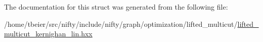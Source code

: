 The documentation for this struct was generated from the following file\+:\begin{DoxyCompactItemize}
\item 
/home/tbeier/src/nifty/include/nifty/graph/optimization/lifted\+\_\+multicut/\hyperlink{lifted__multicut__kernighan__lin_8hxx}{lifted\+\_\+multicut\+\_\+kernighan\+\_\+lin.\+hxx}\end{DoxyCompactItemize}
